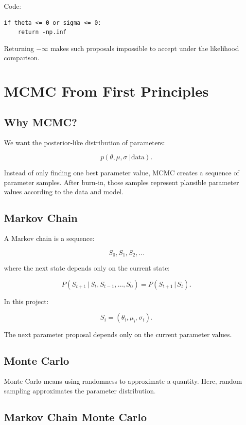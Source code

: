 \documentclass[11pt]{article}
\newcommand{\given}{\,|\,}
\begin{document}
Code:

\begin{lstlisting}[style=pythonstyle]
if theta <= 0 or sigma <= 0:
    return -np.inf
\end{lstlisting}

Returning $-\infty$ makes such proposals impossible to accept under the
likelihood comparison.

\section{MCMC From First Principles}

\subsection{Why MCMC?}

We want the posterior-like distribution of parameters:

\[
p(\theta,\mu,\sigma \given \text{data}).
\]

Instead of only finding one best parameter value, MCMC creates a sequence of
parameter samples. After burn-in, those samples represent plausible parameter
values according to the data and model.

\subsection{Markov Chain}

A Markov chain is a sequence:

\[
S_0,S_1,S_2,\dots
\]

where the next state depends only on the current state:

\[
P(S_{t+1}\given S_t,S_{t-1},\dots,S_0)
=
P(S_{t+1}\given S_t).
\]

In this project:

\[
S_i = (\theta_i,\mu_i,\sigma_i).
\]

The next parameter proposal depends only on the current parameter values.

\subsection{Monte Carlo}

Monte Carlo means using randomness to approximate a quantity. Here, random
sampling approximates the parameter distribution.

\subsection{Markov Chain Monte Carlo}
\end{document}
